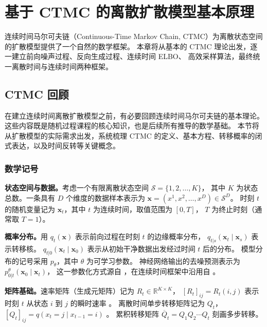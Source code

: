 \documentclass[12pt,a4paper]{ctexbook}
\theoremstyle{definition}
\begin{document}
\chapter{基于 CTMC 的离散扩散模型基本原理}

连续时间马尔可夫链（Continuous-Time Markov Chain, CTMC）为离散状态空间的扩散模型提供了一个自然的数学框架。
本章将从基本的 CTMC 理论出发，逐一建立前向噪声过程、反向生成过程、连续时间 ELBO、
高效采样算法，最终统一离散时间与连续时间两种框架。

\section{CTMC 回顾}
\label{sec:ctmc-basics}

在建立连续时间离散扩散模型之前，有必要回顾连续时间马尔可夫链的基本理论。
这些内容既是随机过程课程的核心知识，也是后续所有推导的数学基础。
本节将从扩散模型的实际需求出发，系统梳理 CTMC 的定义、基本方程、转移概率的闭式表达，以及时间反转等关键概念。

\subsection{数学记号}

\textbf{状态空间与数据。}考虑一个有限离散状态空间 $\mathcal{S} = \{1, 2, \dots, K\}$，
其中 $K$ 为状态总数。一条具有 $D$ 个维度的数据样本表示为
$\boldsymbol{x} = (x^1, x^2, \dots, x^D) \in \mathcal{S}^D$。
时刻 $t$ 的随机变量记为 $\boldsymbol{x}_t$，其中 $t$ 为连续时间，取值范围为 $[0, T]$，
$T$ 为终止时刻（通常取 $T = 1$）。

\textbf{概率分布。}用 $q_t(\boldsymbol{x})$ 表示前向过程在时刻 $t$ 的边缘概率分布，
$q_{t|s}(\boldsymbol{x}_t \mid \boldsymbol{x}_s)$ 表示转移核。
$q_{t|0}(\boldsymbol{x}_t \mid \boldsymbol{x}_0)$ 表示从初始干净数据出发经过时间 $t$ 后的分布。
模型分布的记号采用 $p_\theta$，其中 $\theta$ 为可学习参数。
神经网络输出的去噪预测表示为 $p_{0|t}^\theta(\boldsymbol{x}_0 \mid \boldsymbol{x}_t)$，
这一参数化方式源自 \cite[§2]{austin2021d3pm}，在连续时间框架中沿用自 \cite[§3.1]{campbell2022ctmc}。

\textbf{矩阵基础。}速率矩阵（生成元矩阵）记为 $R_t \in \mathbb{R}^{K \times K}$，
$[R_t]_{ij} = R_t(i, j)$ 表示时刻 $t$ 从状态 $i$ 到 $j$ 的瞬时速率
\cite[§3.1]{campbell2022ctmc}。
离散时间单步转移矩阵记为 $Q_t$，$[Q_t]_{ij} = q(x_t = j \mid x_{t-1} = i)$
\cite[§2]{austin2021d3pm}。
累积转移矩阵 $\overline{Q}_{t} = Q_1 Q_2 \cdots Q_t$ 刻画多步转移。
\end{document}
